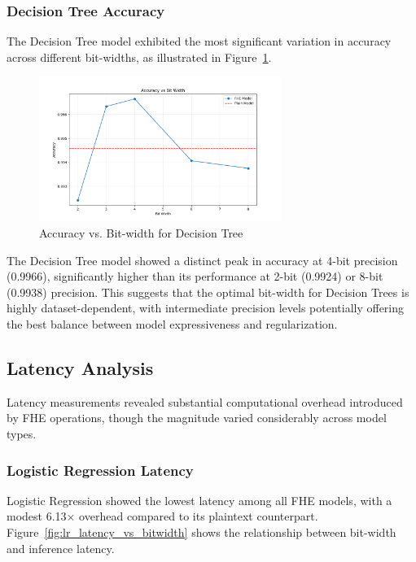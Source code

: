 \documentclass[a4paper,12pt]{article}
\begin{document}
\subsubsection{Decision Tree Accuracy}
The Decision Tree model exhibited the most significant variation in accuracy across different bit-widths, as illustrated in Figure~\ref{fig:dt_accuracy_vs_bitwidth}.

\begin{figure}[h]
\centering
\includegraphics[width=0.7\textwidth]{results/dt/dt_accuracy.png}
\caption{Accuracy vs. Bit-width for Decision Tree}
\label{fig:dt_accuracy_vs_bitwidth}
\end{figure}

The Decision Tree model showed a distinct peak in accuracy at 4-bit precision (0.9966), significantly higher than its performance at 2-bit (0.9924) or 8-bit (0.9938) precision. This suggests that the optimal bit-width for Decision Trees is highly dataset-dependent, with intermediate precision levels potentially offering the best balance between model expressiveness and regularization.

\subsection{Latency Analysis}
Latency measurements revealed substantial computational overhead introduced by FHE operations, though the magnitude varied considerably across model types.

\subsubsection{Logistic Regression Latency}
Logistic Regression showed the lowest latency among all FHE models, with a modest 6.13× overhead compared to its plaintext counterpart. Figure~\ref{fig:lr_latency_vs_bitwidth} shows the relationship between bit-width and inference latency.
\end{document}
